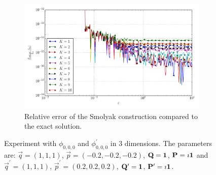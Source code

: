 \documentclass[a4paper,10pt]{article}
\begin{document}
\begin{figure}[ht!]
\begin{subfigure}[t]{0.5\linewidth}
    \includegraphics[width=\linewidth]{./plots/tp_sg_3d_conv_eps_(0,0,0)_(0,0,0)_err_rel_nsd_gk.pdf}
    \caption{Relative error of the Smolyak construction compared to the exact solution.}
    \label{fig:tp_sg_3d_conv_eps_000_000_err_rel_nsd_gk}
  \end{subfigure}
  \label{fig:tp_sg_3d_conv_eps_000_000}
  \caption{Experiment with $\phi_{0,0,0}$ and $\phi_{0,0,0}^{\prime}$
  in 3 dimensions.
  The parameters are:
  $\vec{q} = (1, 1, 1)$,
  $\vec{p} = (-0.2, -0.2, -0.2)$,
  $\mathbf{Q} = \mathbf{1}$,
  $\mathbf{P} = \imath \mathbf{1}$
  and
  $\vec{q}^\prime = (1, 1, 1)$,
  $\vec{p}^\prime = (0.2, 0.2, 0.2)$,
  $\mathbf{Q}^\prime = \mathbf{1}$,
  $\mathbf{P}^\prime = \imath \mathbf{1}$.}
\end{figure}
\end{document}
